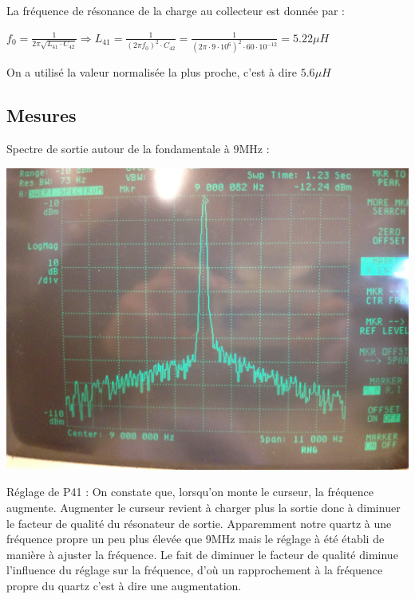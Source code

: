 \documentclass{article}
\begin{document}
La fréquence de résonance de la charge au collecteur est donnée par :
\begin{center}
$f_0 = \frac{1}{2\pi \sqrt{L_{41} \cdot C_{42}}}
\Rightarrow
L_{41} = \frac{1}{(2\pi f_0)^2 \cdot C_{42}} = \frac{1}{(2\pi \cdot 9 \cdot 10^6)^2 \cdot 60 \cdot 10^{-12}} = 5.22 \mu H$
\end{center}
On a utilisé la valeur normalisée la plus proche, c'est à dire $5.6 \mu H$

\subsection{Mesures}



Spectre de sortie autour de la fondamentale à 9MHz :\\
\begin{center}
\includegraphics[width = 0.7\linewidth]{7_3_3_spectre9MHz.jpg}
\end{center}


Réglage de P41 : On constate que, lorsqu'on monte le curseur, la fréquence augmente. Augmenter le curseur revient à charger plus la sortie donc à diminuer le facteur de qualité du résonateur de sortie. Apparemment notre quartz à une fréquence propre un peu plus élevée que 9MHz mais le réglage à été établi de manière à ajuster la fréquence. Le fait de diminuer le facteur de qualité diminue l'influence du réglage sur la fréquence, d'où un rapprochement à la fréquence propre du quartz c'est à dire une augmentation.


\end{document}
